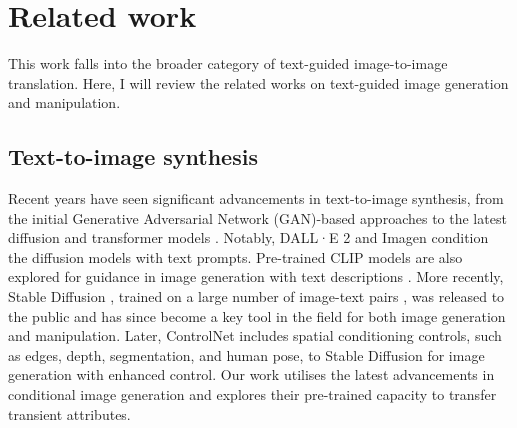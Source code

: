 \section{Related work}\label{zero-shot-RW}
This work falls into the broader category of text-guided image-to-image translation. Here, I will review the related works on text-guided image generation and manipulation.

\subsection{Text-to-image synthesis}

Recent years have seen significant advancements in text-to-image synthesis, from the initial Generative Adversarial Network (\gls{GAN})-based approaches \cite{li2020manigan,xu2018attngan,zhang2017stackgan,zhang2018stackgan++} to the latest diffusion \cite{gu2022vector,ho2020denoising,nichol2021improved,ramesh2022hierarchical,rombach2022high,saharia2022photorealistic,song2020denoising,zhang2023adding} and transformer models \cite{ding2022cogview2,esser2021taming,ramesh2021zero,yu2022scaling}. Notably, DALL·E 2 \cite{ramesh2022hierarchical} and Imagen \cite{ho2022imagen} condition the diffusion models with text prompts. Pre-trained CLIP models \cite{radford2021learning} are also explored for guidance in image generation with text descriptions \cite{crowson2022vqgan,ramesh2022hierarchical}. More recently, Stable Diffusion \cite{rombach2022high}, trained on a large number of image-text pairs \cite{schuhmann2021laion}, was released to the public and has since become a key tool in the field for both image generation and manipulation. Later, ControlNet \cite{zhang2023adding} includes spatial conditioning controls, such as edges, depth, segmentation, and human pose, to Stable Diffusion for image generation with enhanced control. Our work utilises the latest advancements in conditional image generation and explores their pre-trained capacity to transfer transient attributes.


